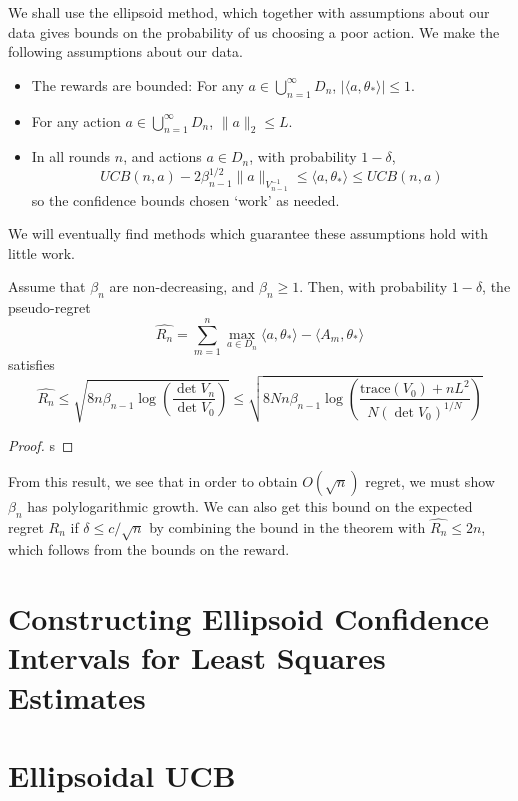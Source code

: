 We shall use the ellipsoid method, which together with assumptions about our data gives bounds on the probability of us choosing a poor action. We make the following assumptions about our data.

\begin{itemize}
    \item The rewards are bounded: For any $a \in \bigcup_{n = 1}^\infty D_n$, $|\langle a, \theta_* \rangle| \leq 1$.
    \item For any action $a \in \bigcup_{n = 1}^\infty D_n$, $\| a \|_2 \leq L$.
    \item In all rounds $n$, and actions $a \in D_n$, with probability $1 - \delta$,
    \[ UCB(n,a) - 2 \beta_{n-1}^{1/2} \| a \|_{V_{n-1}^{-1}} \leq \langle a, \theta_* \rangle \leq UCB(n,a) \]
    so the confidence bounds chosen `work' as needed.
\end{itemize}

We will eventually find methods which guarantee these assumptions hold with little work.

\begin{theorem}
    Assume that $\beta_n$ are non-decreasing, and $\beta_n \geq 1$. Then, with probability $1 - \delta$, the pseudo-regret
    \[ \widehat{R_n} = \sum_{m = 1}^n \max_{a \in D_n} \langle a, \theta_* \rangle - \langle A_m, \theta_* \rangle \]
    satisfies
    \[ \widehat{R_n} \leq \sqrt{8n \beta_{n-1} \log \left( \frac{\det V_n}{\det V_0} \right)} \leq \sqrt{8Nn \beta_{n-1} \log \left( \frac{\text{trace}(V_0) + nL^2}{N (\det V_0)^{1/N}} \right)} \]
\end{theorem}
\begin{proof}
    s
\end{proof}

From this result, we see that in order to obtain $O(\sqrt{n})$ regret, we must show $\beta_n$ has polylogarithmic growth. We can also get this bound on the expected regret $R_n$ if $\delta \leq c/\sqrt{n}$ by combining the bound in the theorem with $\hat{R_n} \leq 2n$, which follows from the bounds on the reward.

\section{Constructing Ellipsoid Confidence Intervals for Least Squares Estimates}

\section{Ellipsoidal UCB}

